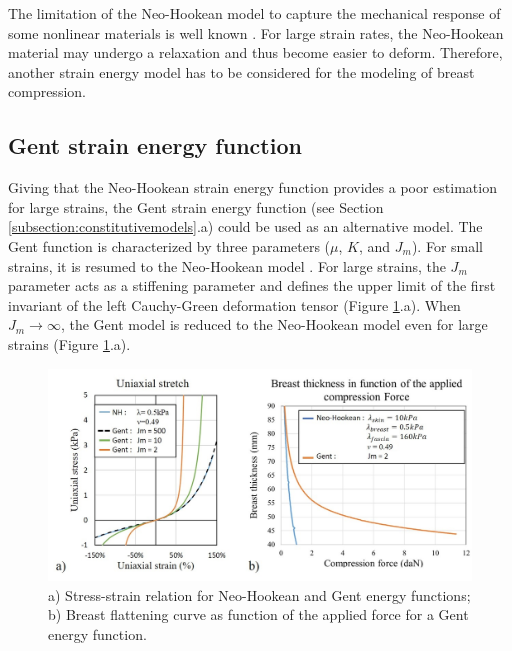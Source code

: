 The limitation of the Neo-Hookean model to capture the mechanical response of some nonlinear materials is well known \citep{kaliske_finite_1997}. For large strain rates, the Neo-Hookean material may undergo a relaxation and thus become easier to deform. Therefore, another strain energy model has to be considered for the modeling of breast compression.

\subsection{Gent strain energy function}
Giving that the Neo-Hookean strain energy function provides a poor estimation for large strains, the Gent strain energy function (see Section \ref{subsection:constitutivemodels}.a)  could be used as an alternative model. The Gent function is characterized by three parameters ($\mu$, $K$, and $J_m$). For small strains, it is resumed to the Neo-Hookean model \citep{chagnon_comparison_2004}. For large strains, the $J_m$ parameter acts as a stiffening parameter and defines the upper limit of the first invariant of the left Cauchy-Green deformation tensor (Figure \ref{fig:GentvsNeoStrain}.a).  When $J_m \longrightarrow \infty$, the Gent model is reduced to the Neo-Hookean model even for large strains (Figure \ref{fig:GentvsNeoStrain}.a).  
 
\begin{figure}[!h]
\centering
\includegraphics[width=1\textwidth,keepaspectratio]{figures/GentvsNeoStrain.jpg} 
\caption{a) Stress-strain relation for Neo-Hookean and Gent energy functions; b) Breast flattening curve as function of the applied force for a Gent energy function.}
\label{fig:GentvsNeoStrain}
\end{figure}


